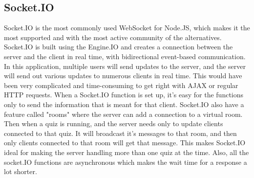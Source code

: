 \subsection{Socket.IO}
Socket.IO is the most commonly used WebSocket for Node.JS, which makes it the most supported and with the most active community of the alternatives. Socket.IO is built using the Engine.IO and creates a connection between the server and the client in real time, with bidirectional event-based communication. In this application, multiple users will send updates to the server, and the server will send out various updates to numerous clients in real time. This would have been very complicated and time-consuming to get right with AJAX or regular HTTP requests. When a Socket.IO function is set up, it's easy for the functions only to send the information that is meant for that client. Socket.IO also have a feature called "rooms" where the server can add a connection to a virtual room. Then when a quiz is running, and the server needs only to update clients connected to that quiz. It will broadcast it's messages to that room, and then only clients connected to that room will get that message. This makes Socket.IO ideal for making the server handling more than one quiz at the time. Also, all the socket.IO functions are asynchronous which makes the wait time for a response a lot shorter.

